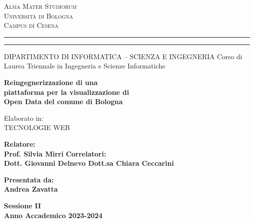 
\oddsidemargin=25pt

\begin{titlepage}
\begin{center}
{{\Large{\textsc{Alma Mater Studiorum}}}\\
{\Large{\textsc{Universit\`a di Bologna}}} \\
{\textsc{Campus di Cesena}} \rule[0.1cm]{14cm}{0.1mm}
		\rule[0.5cm]{14cm}{0.6mm}
DIPARTIMENTO DI INFORMATICA – SCIENZA E INGEGNERIA
Corso di Laurea Triennale in Ingegneria e Scienze Informatiche }
\end{center}
\vspace{15mm}
\begin{center}
{\LARGE{\bf Reingegnerizzazione di una}}\\
\vspace{3mm}
{\LARGE{\bf piattaforma per la visualizzazione di}}\\
\vspace{3mm}
{\LARGE{\bf Open Data del comune di Bologna}}\\
\end{center}
\vspace{15mm}
\begin{center}
 {\large{ Elaborato in:\\
TECNOLOGIE WEB\\}}   
\end{center}
\vspace{20mm}
\par
\noindent
\begin{minipage}[t]{0.47\textwidth}
{\large{\bf Relatore:\\
Prof. Silvia Mirri}}
\newline
{\large{\bf Correlatori:\\
Dott.  Giovanni Delnevo
Dott.sa Chiara Ceccarini
}}
\end{minipage}
\hfill
\begin{minipage}[t]{0.47\textwidth}\raggedleft
{\large{\bf Presentata da:\\
Andrea Zavatta}}
\end{minipage}
\vspace{10mm}
\begin{center}
{\large{\bf Sessione II\\%
Anno Accademico 2023-2024}}%
\end{center}
\end{titlepage}
